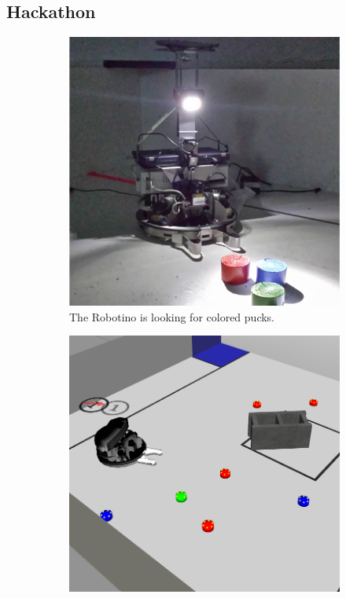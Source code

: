 \subsection{Hackathon}
\begin{figure}
  \centering
  \begin{subfigure}[b]{0.47\textwidth}
    \includegraphics[width=\textwidth, height=\textwidth]{pics/hackathon_real_de}
    \caption{The Robotino is looking for colored pucks.}
    \label{fig:hackathon_real}
  \end{subfigure}
  \begin{subfigure}[b]{0.47\textwidth}
    \includegraphics[width=\textwidth, height=\textwidth]{pics/hackathon_sim}

\end{subfigure}
\end{figure}
